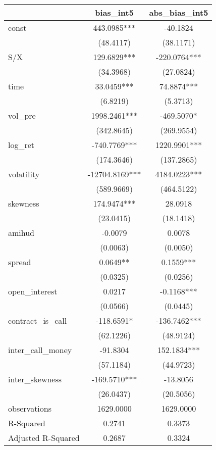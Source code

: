 \begin{tabular}{lcc}
\hline
                   &   bias\_int5   & abs\_bias\_int5  \\
\midrule
\midrule
const              & 443.0985***    & -40.1824         \\
                   & (48.4117)      & (38.1171)        \\
S/X                & 129.6829***    & -220.0764***     \\
                   & (34.3968)      & (27.0824)        \\
time               & 33.0459***     & 74.8874***       \\
                   & (6.8219)       & (5.3713)         \\
vol\_pre           & 1998.2461***   & -469.5070*       \\
                   & (342.8645)     & (269.9554)       \\
log\_ret           & -740.7769***   & 1220.9901***     \\
                   & (174.3646)     & (137.2865)       \\
volatility         & -12704.8169*** & 4184.0223***     \\
                   & (589.9669)     & (464.5122)       \\
skewness           & 174.9474***    & 28.0918          \\
                   & (23.0415)      & (18.1418)        \\
amihud             & -0.0079        & 0.0078           \\
                   & (0.0063)       & (0.0050)         \\
spread             & 0.0649**       & 0.1559***        \\
                   & (0.0325)       & (0.0256)         \\
open\_interest     & 0.0217         & -0.1168***       \\
                   & (0.0566)       & (0.0445)         \\
contract\_is\_call & -118.6591*     & -136.7462***     \\
                   & (62.1226)      & (48.9124)        \\
inter\_call\_money & -91.8304       & 152.1834***      \\
                   & (57.1184)      & (44.9723)        \\
inter\_skewness    & -169.5710***   & -13.8056         \\
                   & (26.0437)      & (20.5056)        \\
observations       & 1629.0000      & 1629.0000        \\
R-Squared          & 0.2741         & 0.3373           \\
Adjusted R-Squared & 0.2687         & 0.3324           \\
\hline
\end{tabular}